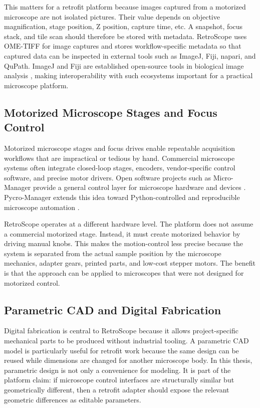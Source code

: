 This matters for a retrofit platform because images captured from a motorized microscope are not isolated pictures. Their value depends on objective magnification, stage position, Z position, capture time, etc. A snapshot, focus stack, and tile scan should therefore be stored with metadata. RetroScope uses OME-TIFF for image captures and stores workflow-specific metadata so that captured data can be inspected in external tools such as ImageJ, Fiji, napari, and QuPath. ImageJ and Fiji are established open-source tools in biological image analysis \cite{schneider2012nih,schindelin2012fiji}, making interoperability with such ecosystems important for a practical microscope platform.

\subsection{Motorized Microscope Stages and Focus Control}

Motorized microscope stages and focus drives enable repeatable acquisition workflows that are impractical or tedious by hand. Commercial microscope systems often integrate closed-loop stages, encoders, vendor-specific control software, and precise motor drivers. Open software projects such as Micro-Manager provide a general control layer for microscope hardware and devices \cite{microManager2007,edelstein2014advanced}. Pycro-Manager extends this idea toward Python-controlled and reproducible microscope automation \cite{pinkard2021pycromanager}.

RetroScope operates at a different hardware level. The platform does not assume a commercial motorized stage. Instead, it must create motorized behavior by driving manual knobs. This makes the motion-control less precise because the system is separated from the actual sample position by the microscope mechanics, adapter gears, printed parts, and low-cost stepper motors. The benefit is that the approach can be applied to microscopes that were not designed for motorized control.

\subsection{Parametric CAD and Digital Fabrication}

Digital fabrication is central to RetroScope because it allows project-specific mechanical parts to be produced without industrial tooling. A parametric CAD model is particularly useful for retrofit work because the same design can be reused while dimensions are changed for another microscope body. In this thesis, parametric design is not only a convenience for modeling. It is part of the platform claim: if microscope control interfaces are structurally similar but geometrically different, then a retrofit adapter should expose the relevant geometric differences as editable parameters.

